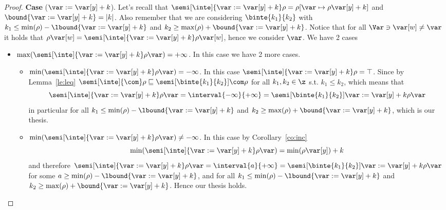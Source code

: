\begin{proof}
  \noindent
  \textbf{Case} (\(\var := \var[y] + k\)).
  Let's recall that
  \({\semi[\inte]{\var := \var[y] + k}\rho = \rho[\var \mapsto
    \rho\var[y] + k]}\) and \(\bound{\var := \var[y] + k} =
  |k|\). Also remember that we are considering \(\binte{k_1}{k_2}\)
  with \(k_1 \leq \min(\rho) - \lbound{\var := \var[y] + k}\) and
  \(k_2 \geq \max(\rho) + \bound{\var := \var[y] + k}\). Notice that
  for all \(\Var \ni \var[w] \neq \var \) it holds that
  \(\rho\var[w] = \semi[\inte]{\var := \var[y] + k}\rho\var[w]\),
  hence we consider \(\var\). We have 2 cases
  \begin{itemize}
  \item
    \({\max(\semi[\inte]{\var := \var[y] + k}\rho\var)} =
    +\infty\). In this case we have 2 more cases.
    \begin{itemize}
    \item
      \({\min(\semi[\inte]{\var := \var[y] + k}\rho\var)} =
      -\infty\). In this case
      \({\semi[\inte]{\var := \var[y] + k}\rho} = \top\). Since by
      Lemma~\ref{le:leq}
      \(\semi[\inte]{\com}\rho \sqsubseteq
      \semi[\binte{k_1}{k_2}]{\com}\rho\) for all \(k_1, k_2 \in \z\)
      s.t. \(k_1 \leq k_2\), which means that
      \begin{equation*}
        \semi[\inte]{\var := \var[y] + k}\rho\var = \interval{-\infty}{+\infty} = \semi[\binte{k_1}{k_2}]{\var := \var[y] + k}\rho\var
      \end{equation*}
      in particular for all
      \(k_1 \leq \min(\rho) - \lbound{\var := \var[y] + k}\) and
      \(k_2 \geq \max(\rho) + \bound{\var := \var[y] + k}\), which is
      our thesis.
    \item
      \({\min(\semi[\inte]{\var := \var[y] + k}\rho\var)} \neq -
      \infty\). In this case by Corollary~\ref{co:inc}
      \begin{equation*}
        \min(\semi[\inte]{\var := \var[y] + k}\rho\var) = \min(\rho\var[y]) + k
      \end{equation*}
      and therefore
      \({\semi[\inte]{\var := \var[y] + k}\rho\var} =
      \interval{a}{+\infty} = {\semi[\binte{k_1}{k_2}]{\var := \var[y]
          + k}\rho\var}\) for some
      \(a \geq \min(\rho) - \lbound{\var := \var[y] + k}\), and for
      all \(k_1 \leq \min(\rho)- \lbound{\var := \var[y] + k}\) and
      \(k_2 \geq \max(\rho) + \bound{\var := \var[y] + k}\). Hence our
      thesis holds.


\end{itemize}
\end{itemize}
\end{proof}
